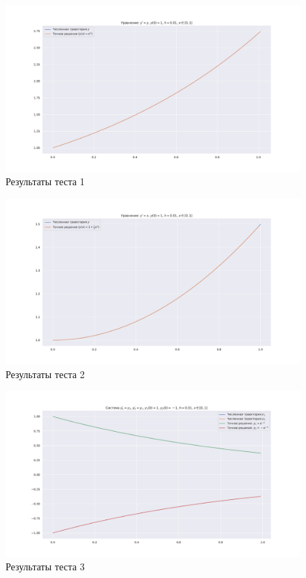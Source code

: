 \documentclass[14pt,a4paper]{extarticle}
\newcommand{\1}{\mathbbm{1}}
\begin{document}
\begin{figure}
    \centering
    \includegraphics[scale=0.4]{figs/Test1.pdf}
    \caption{Результаты теста 1}
\end{figure}

\begin{figure}
    \centering
    \includegraphics[scale=0.4]{figs/Test2.pdf}
    \caption{Результаты теста 2}
\end{figure}

\begin{figure}
    \centering
    \includegraphics[scale=0.4]{figs/Test3.pdf}
    \caption{Результаты теста 3}
\end{figure}
\end{document}
